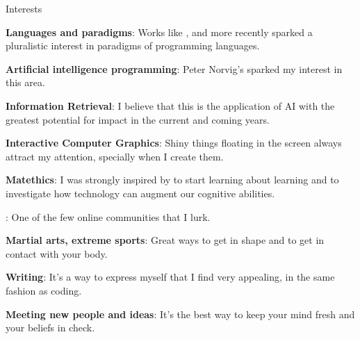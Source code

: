 \begin{rubric}{Interests}{

    \entry* \textbf{Languages and paradigms}: Works like
    ,
     and more recently
     sparked a pluralistic interest
    in paradigms of programming languages.

    \entry* \textbf{Artificial intelligence programming}: Peter
    Norvig's 
    sparked my interest in this area.

    \entry* \textbf{Information Retrieval}: I believe
    that this is the application of AI with the greatest potential for impact  in the
    current and coming years.

    \entry* \textbf{Interactive Computer Graphics}: Shiny things
    floating in the screen always attract my attention, specially when
    I create them.

    \entry* \textbf{Matethics}: I was strongly inspired by
    to start learning about learning and to investigate how technology can augment
    our cognitive abilities.


    \entry* \textbf{}: One of the few online
    communities that I lurk.

    \entry* \textbf{Martial arts, extreme sports}: Great ways to get in shape and to get in
    contact with your body.

    \entry* \textbf{Writing}: It's a way to express myself that I find very
    appealing, in the same fashion as coding.

    \entry* \textbf{Meeting new people and ideas}: It's the best way to keep
    your mind fresh and your beliefs in check. 

}\end{rubric}

